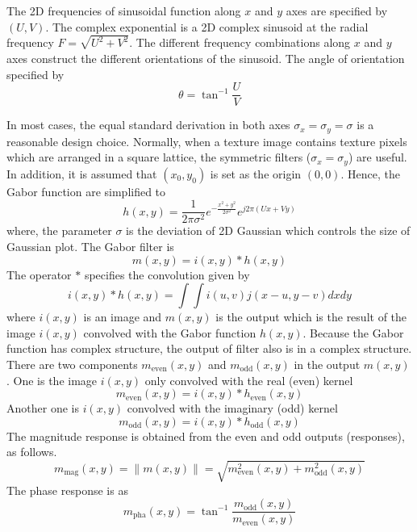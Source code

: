 The 2D frequencies of sinusoidal function along $x$ and $y$ axes are specified by $(U,V)$. The complex exponential is a 2D complex sinusoid at the radial frequency $F=\sqrt{U^2+V^2}$. The different frequency combinations along $x$ and $y$ axes construct the different orientations of the sinusoid. The angle of orientation specified by
\begin{equation}
 \theta =\tan^{-1}\frac{U}{V}
\end{equation}

In most cases, the equal standard derivation in both axes $\sigma_x=\sigma_y=\sigma$ is a reasonable design choice. Normally, when a texture image contains texture pixels which are arranged in a square lattice, the symmetric filters ($\sigma_x=\sigma_y$) are useful. In addition, it is assumed that $(x_0,y_0)$ is set as the origin $(0,0)$. Hence, the Gabor function are simplified to
\begin{equation}
 h(x,y) = \frac{1}{2\pi\sigma^2} e^{-\frac{x^2+y^2}{2\sigma^2}} e^{j2\pi(Ux+Vy)}
\end{equation}
where, the parameter $\sigma$ is the deviation of 2D Gaussian which controls the size of Gaussian plot. The Gabor filter is
\begin{equation}
 m(x,y) = i(x,y)\ast h(x,y)
\end{equation}
The operator $\ast$ specifies the convolution given by
\begin{equation}
 i(x,y)\ast h(x,y) = \int \int i(u,v)j(x-u,y-v)dxdy
\end{equation}
where $i(x,y)$ is an image and $m(x,y)$ is the output which is the result of the image $i(x,y)$ convolved with the Gabor function $h(x,y)$. Because the Gabor function has complex structure, the output of filter also is in a complex structure. There are two components $m_{\mathrm{even}}(x,y)$ and $m_{\mathrm{odd}}(x,y)$ in the output $m(x,y)$. One is the image $i(x,y)$ only convolved with the real (even) kernel
\begin{displaymath}
 m_{\mathrm{even}}(x,y) = i(x,y) \ast h_{\mathrm{even}}(x,y)
\end{displaymath}
Another one is $i(x, y)$ convolved with the imaginary (odd) kernel
\begin{displaymath}
 m_{\mathrm{odd}}(x,y) = i(x,y) \ast h_{\mathrm{odd}}(x,y)
\end{displaymath}
The magnitude response is obtained from the even and odd outputs (responses), as follows.
\begin{displaymath}
 m_{\mathrm{mag}}(x,y) = \|m(x,y)\| = \sqrt{m_{\mathrm{even}}^2(x,y) + m_{\mathrm{odd}}^2(x,y)}
\end{displaymath}
The phase response is as
\begin{displaymath}
 m_{\mathrm{pha}}(x,y) = \tan^{-1}\frac{m_{\mathrm{odd}}(x,y)}{m_{\mathrm{even}}(x,y)}
\end{displaymath}

